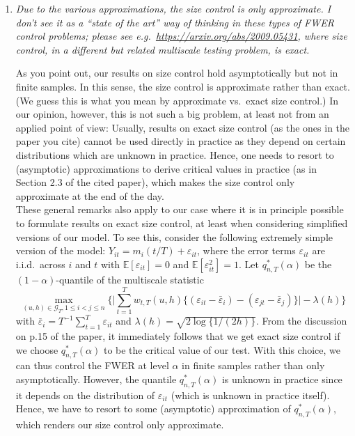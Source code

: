 \documentclass[a4paper,12pt]{article}
\newcommand{\ex}{\mathbb{E}} %
\begin{document}
\begin{enumerate}[label=\arabic*.,leftmargin=0.6cm]
\item \textit{Due to the various approximations, the size control is only approximate. I don’t see it as a ``state of the art'' way of thinking in these types of FWER control problems; please see e.g.\ \url{https://arxiv.org/abs/2009.05431},
where size control, in a different but related multiscale testing problem, is exact.}

As you point out, our results on size control hold asymptotically but not in finite samples. In this sense, the size control is approximate rather than exact. (We guess this is what you mean by approximate vs.\ exact size control.) In our opinion, however, this is not such a big problem, at least not from an applied point of view: Usually, results on exact size control (as the ones in the paper you cite) cannot be used directly in practice as they depend on certain distributions which are unknown in practice. Hence, one needs to resort to (asymptotic) approximations to derive critical values in practice (as in Section 2.3 of the cited paper), which makes the size control only approximate at the end of the day. \\
These general remarks also apply to our case where it is in principle possible to formulate results on exact size control, at least when considering simplified versions of our model. To see this, consider the following extremely simple version of the model: $Y_{it} = m_i(t/T) + \varepsilon_{it}$, where the error terms $\varepsilon_{it}$ are i.i.d.\ across $i$ and $t$ with $\ex[\varepsilon_{it}] = 0$ and $\ex[\varepsilon_{it}^2] = 1$. Let $q_{n,T}^*(\alpha)$ be the $(1-\alpha)$-quantile of the multiscale statistic
\[ \max_{(u,h) \in \mathcal{G}_T, 1 \le i < j \le n} \bigg\{ \Big| \sum\limits_{t=1}^T w_{t,T}(u, h) \{ (\varepsilon_{it} - \bar{\varepsilon}_i) - (\varepsilon_{jt} - \bar{\varepsilon}_j) \} \Big| - \lambda(h) \bigg\} \]
with $\bar{\varepsilon}_i = T^{-1} \sum_{t=1}^T \varepsilon_{it}$ and $\lambda(h) = \sqrt{2 \log\{1/(2h)\}}$. From the discussion on p.15 of the paper, it immediately follows that we get exact size control if we choose $q_{n,T}^*(\alpha)$ to be the critical value of our test. With this choice, we can thus control the FWER at level $\alpha$ in finite samples rather than only asymptotically. However, the quantile $q_{n,T}^*(\alpha)$ is unknown in practice since it depends on the distribution of $\varepsilon_{it}$ (which is unknown in practice itself). Hence, we have to resort to some (asymptotic) approximation of $q_{n,T}^*(\alpha)$, which renders our size control only approximate. 


\end{enumerate}
\end{document}
